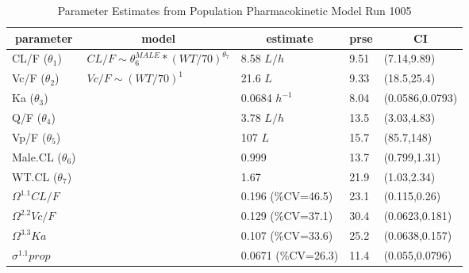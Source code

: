 \begin{table}[ht]
 \caption[Model 1005 Parameters]{Parameter Estimates from Population Pharmacokinetic Model Run 1005\label{p1005}} 
 \begin{center}
 \begin{tabular}{lllll}\hline\hline
\multicolumn{1}{c}{parameter}&\multicolumn{1}{c}{model}&\multicolumn{1}{c}{estimate}&\multicolumn{1}{c}{prse}&\multicolumn{1}{c}{CI}\tabularnewline
\hline
CL/F ($\theta_1$)&$CL/F \sim \theta_6^{MALE} * (WT/70)^{\theta_7}$&8.58 $L/h$&9.51&(7.14,9.89)\tabularnewline
Vc/F ($\theta_2$)&$Vc/F \sim (WT/70)^{1}$&21.6 $L$&9.33&(18.5,25.4)\tabularnewline
Ka ($\theta_3$)&&0.0684 $h^{-1}$&8.04&(0.0586,0.0793)\tabularnewline
Q/F ($\theta_4$)&&3.78 $L/h$&13.5&(3.03,4.83)\tabularnewline
Vp/F ($\theta_5$)&&107 $L$&15.7&(85.7,148)\tabularnewline
Male.CL ($\theta_6$)&&0.999&13.7&(0.799,1.31)\tabularnewline
WT.CL ($\theta_7$)&&1.67&21.9&(1.03,2.34)\tabularnewline
$\Omega^{1.1}CL/F$&&0.196 (\%CV=46.5)&23.1&(0.115,0.26)\tabularnewline
$\Omega^{2.2}Vc/F$&&0.129 (\%CV=37.1)&30.4&(0.0623,0.181)\tabularnewline
$\Omega^{3.3}Ka$&&0.107 (\%CV=33.6)&25.2&(0.0638,0.157)\tabularnewline
$\sigma^{1.1}prop$&&0.0671 (\%CV=26.3)&11.4&(0.055,0.0796)\tabularnewline
\hline
\end{tabular}

\end{center}

\end{table}
